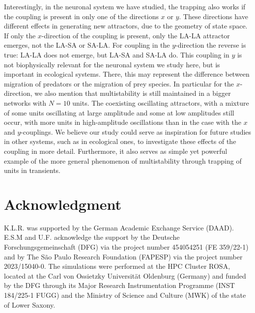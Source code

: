 Interestingly, in the neuronal system we have studied, the trapping also works if the coupling is present in only one of the directions $x$ or $y$. These directions have different effects in generating new attractors, due to the geometry of state space. If only the $x$-direction of the coupling is present, only the LA-LA attractor emerges, not the LA-SA or SA-LA. For coupling in the $y$-direction the reverse is true: LA-LA does not emerge, but LA-SA and SA-LA do. This coupling in $y$ is not biophysically relevant for the neuronal system we study here, but is important in ecological systems. There, this may represent the difference between migration of predators or the migration of prey species. In particular for the $x$-direction, we also mention that multistability is still maintained in a bigger networks with $N=10$ units. The coexisting oscillating attractors, with a mixture of some units oscillating at large amplitude and some at low amplitudes still occur, with more units in high-amplitude oscillations than in the case with the $x$ and $y$-couplings. We believe our study could serve as inspiration for future studies in other systems, such as in ecological ones, to investigate these effects of the coupling in more detail. Furthermore, it also serves as simple yet powerful example of the more general phenomenon of multistability through trapping of units in transients.



\section*{Acknowledgment}
K.L.R. was supported by the German Academic Exchange Service (DAAD).  E.S.M and U.F. acknowledge the support by the Deutsche Forschungsgemeinschaft (DFG) via the project number 454054251 (FE 359/22-1) and by The S\~ao Paulo Research Foundation (FAPESP) via the project number 2023/15040-0. The simulations were performed at the HPC Cluster ROSA, located at the Carl von Ossietzky Universität Oldenburg (Germany) and funded by the DFG through its Major Research Instrumentation Programme (INST 184/225-1 FUGG) and the Ministry of Science and Culture (MWK) of the state of Lower Saxony.

